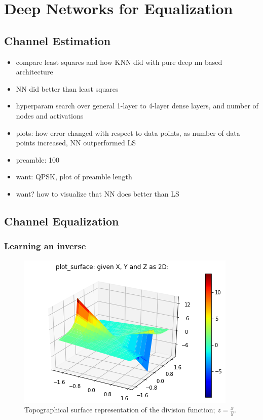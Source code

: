 \chapter{Deep Networks for Equalization}

\section{Channel Estimation}

\begin{itemize}
\item compare least squares and how KNN did with pure deep nn based architecture
\item NN did better than least squares
\item hyperparam search over general 1-layer to 4-layer dense layers, and number of nodes and activations
\item plots: how error changed with respect to data points, as number of data points increased, NN outperformed LS
\item preamble: 100
\item want: QPSK, plot of preamble length
\item want? how to visualize that NN does better than LS
\end{itemize}




\section{Channel Equalization}

\subsection{Learning an inverse}

\begin{figure}
\begin{center}
\includegraphics{figures/equal/Division_Function_plot.png}
\caption{Topographical surface representation of the division function; $z=\frac{x}{y}$.}
\end{center}
\label{fig:div_fx}
\end{figure}

